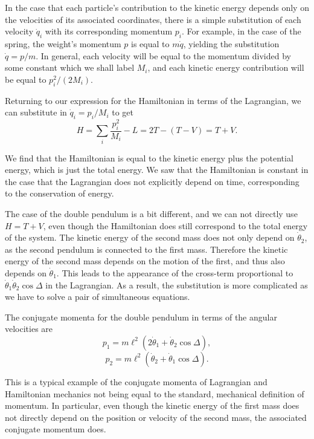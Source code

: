 \documentclass[11pt]{article}
\begin{document}
In the case that each particle's contribution to the kinetic energy depends only on the velocities of its associated coordinates, there is a simple substitution of each velocity $\dot{q}_i$ with its corresponding momentum $p_i$. For example, in the case of the spring, the weight's momentum $p$ is equal to $m\dot{q}$, yielding the substitution $\dot{q}=p/m$. In general, each velocity will be equal to the momentum divided by some constant which we shall label $M_i$, and each kinetic energy contribution will be equal to $p_i^2/(2M_i)$.
\newline

Returning to our expression for the Hamiltonian in terms of the Lagrangian, we can substitute in $\dot{q}_i=p_i/M_i$ to get
$$H=\sum_i\frac{p_i^2}{M_i}-L=2T-(T-V)=T+V.$$

We find that the Hamiltonian is equal to the kinetic energy plus the potential energy, which is just the total energy. We saw that the Hamiltonian is constant in the case that the Lagrangian does not explicitly depend on time, corresponding to the conservation of energy.
\newline

The case of the double pendulum is a bit different, and we can not directly use $H=T+V$, even though the Hamiltonian does still correspond to the total energy of the system. The kinetic energy of the second mass does not only depend on $\dot{\theta}_2$, as the second pendulum is connected to the first mass. Therefore the kinetic energy of the second mass depends on the motion of the first, and thus also depends on $\dot{\theta}_1$. This leads to the appearance of the cross\hyp{}term proportional to $\dot{\theta}_1\dot{\theta}_2\cos\Delta$ in the Lagrangian. As a result, the substitution is more complicated as we have to solve a pair of simultaneous equations.
\newpage

The conjugate momenta for the double pendulum in terms of the angular velocities are
$$p_1=m\ell^2\left(2\dot{\theta}_1+\dot{\theta}_2\cos\Delta\right),$$
$$p_2=m\ell^2\left(\dot{\theta}_2+\dot{\theta}_1\cos\Delta\right).$$

This is a typical example of the conjugate momenta of Lagrangian and Hamiltonian mechanics not being equal to the standard, mechanical definition of momentum. In particular, even though the kinetic energy of the first mass does not directly depend on the position or velocity of the second mass, the associated conjugate momentum does.
\newline
\end{document}
